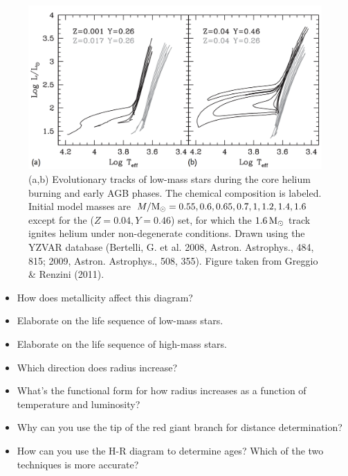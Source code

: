 \documentclass[a4paper,10pt]{article}
\begin{document}
\begin{figure}[t]
    \centering
    \includegraphics[width=14cm]{figures/HRD_Z_low.png}
    \caption{\footnotesize{(a,b) Evolutionary tracks of low-mass stars during the core helium burning and early AGB phases. The chemical composition is labeled. Initial model masses are $M/{\rm M_\odot}=0.55,0.6,0.65,0.7,1,1.2,1.4,1.6$ except for the ($Z=0.04,Y=0.46$) set, for which the $1.6\,{\rm M_\odot}$ track ignites helium under non-degenerate conditions. Drawn using the YZVAR database (Bertelli, G. et al. 2008, Astron. Astrophys., 484, 815; 2009, Astron. Astrophys., 508, 355). Figure taken from Greggio \& Renzini (2011).}}
    \label{fig:hrdz_low}
\end{figure}

\begin{itemize}
    \item How does metallicity affect this diagram?
    \item Elaborate on the life sequence of low-mass stars.
    \item Elaborate on the life sequence of high-mass stars.
    \item Which direction does radius increase?
    \item What's the functional form for how radius increases as a function of temperature and luminosity?
    \item Why can you use the tip of the red giant branch for distance determination?
    \item How can you use the H-R diagram to determine ages? Which of the two techniques is more accurate?
\end{itemize}

\end{document}
